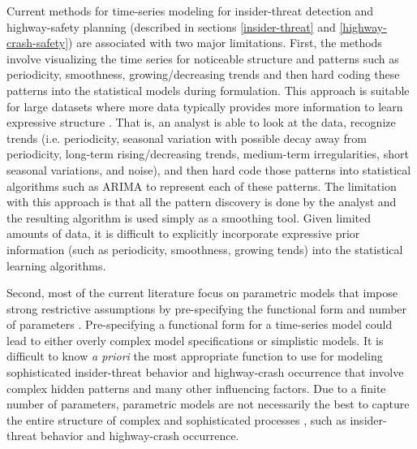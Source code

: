\documentclass[letterpaper]{article}
\begin{document}
Current methods for time-series modeling for insider-threat detection and highway-safety planning (described in sections \ref{insider-threat} and \ref{highway-crash-safety}) are associated with two major limitations.  First, the methods involve visualizing the time series for noticeable structure and patterns such as periodicity, smoothness, growing/decreasing trends and then hard coding these patterns into the statistical models during formulation. This approach is suitable for large datasets where more data typically provides more information to learn expressive structure \citep{wilson2014covariance}. That is, an analyst is able to look at the data, recognize trends (i.e. periodicity, seasonal variation with possible decay away from periodicity, long-term rising/decreasing trends, medium-term irregularities, short seasonal variations, and noise), and then hard code those patterns into statistical algorithms such as ARIMA to represent each of these patterns. The limitation with this approach is that all the pattern discovery is done by the analyst and the resulting algorithm is used simply as a smoothing tool. Given limited amounts of data, it is difficult to explicitly incorporate expressive prior information (such as periodicity, smoothness, growing tends) into the statistical learning algorithms. 

Second, most of the current literature focus on parametric models that impose strong restrictive assumptions by pre-specifying the functional form and number of parameters \citep{veeramisti2016business,gheyas2016detection}. Pre-specifying a functional form for a time-series model could lead to either overly complex model specifications or simplistic models. It is difficult to know \textit{a priori} the most appropriate function to use for modeling sophisticated insider-threat behavior and highway-crash occurrence that involve complex hidden patterns and many other influencing factors. Due to a finite number of parameters, parametric models are not necessarily the best to capture the entire structure of complex and sophisticated processes \citep{ghahramani2015probabilistic}, such as insider-threat behavior and highway-crash occurrence. %
\end{document}
